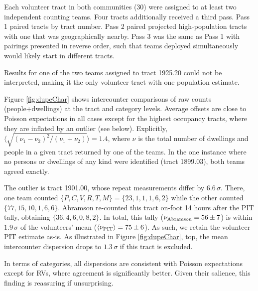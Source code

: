 \documentclass[11pt,twocolumn]{article}
\begin{document}
Each volunteer tract in both communities (30) were assigned to at least two independent counting teams.
Four tracts additionally received a third pass. Pass 1 paired tracts by tract number. Pass 2 paired projected 
high-population tracts with one that was geographically nearby. Pass 3 was the same as Pass 1 with 
pairings presented in reverse order, such that teams deployed simultaneously would likely start in different 
tracts. 

Results for one of the two teams assigned to tract 1925.20 could not be interpreted, making it the only
volunteer tract with one population estimate.

Figure \ref{fig:dupeChar} shows intercounter comparisons of raw counts (people+dwellings)
at the tract and category levels. Average offsets are close to Poisson expectations in all cases 
except for the highest occupancy tracts, where they are inflated by an outlier (see below).
Explicitly, $\langle\sqrt{(\nu_{1}-\nu_{2})^{2}/(\nu_{1} + \nu_{2})}\rangle=1.4$, where
$\nu$ is the total number of dwellings and people in a given tract returned by one of the teams. 
In the one instance where no persons or dwellings of any kind were identified (tract 1899.03), 
both teams agreed exactly.

The outlier is tract 1901.00, whose repeat measurements differ by $6.6\,\sigma$. There, 
one team counted $\{P,C,V,R,T,M\}=\{23,1,1,1,6,2\}$ while the other counted $\{77,15,10,1,6,6\}$. 
Abramson re-counted this tract on-foot 14 hours after the PIT tally, obtaining $\{36, 4, 6, 0, 8, 2\}$.
In total, this tally ($\nu_{\rm Abramson}=56\pm7$) is within $1.9\,\sigma$ of the volunteers' mean 
($\langle\nu_{\rm PIT}\rangle=75\pm6$). As such, we retain the volunteer PIT estimate as-is. As illustrated in 
Figure \ref{fig:dupeChar}, top, the mean intercounter dispersion drops to $1.3\,\sigma$ if this tract is 
excluded.

In terms of categories, all dispersions are consistent with Poisson expectations except for RVs, where 
agreement is significantly better. Given their salience, this finding is reassuring if unsurprising.

\end{document}
